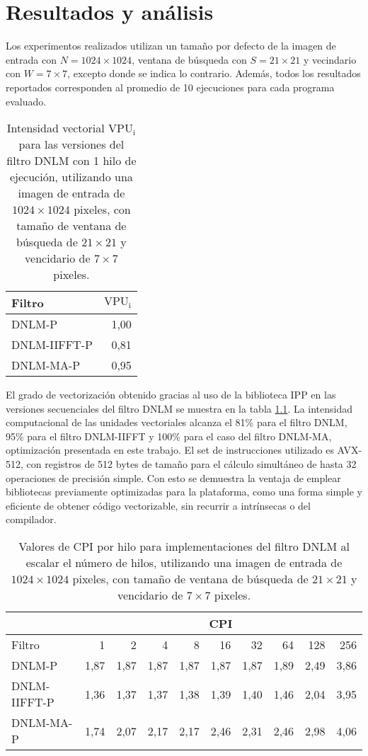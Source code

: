 \chapter{Resultados y análisis}
\label{ch:res}

Los experimentos realizados utilizan un tama\~no por defecto de la imagen de entrada con $N = 1024 \times 1024$, ventana de búsqueda con $S = 21 \times 21$ y vecindario con $W = 7 \times 7$, excepto donde se indica lo contrario. Adem\'as, todos los resultados reportados corresponden al promedio de 10 ejecuciones para cada programa evaluado.  

\begin{table}[htb]
\centering
\caption[Intensidad vectorial de operaciones con un hilo de ejecución]{Intensidad vectorial  $\text{VPU}_{\text{i}}$ para las versiones del filtro DNLM con 1 hilo de ejecución, utilizando una imagen de entrada de $1024 \times 1024$ pixeles, con tama\~no de ventana de búsqueda de $21 \times 21$ y vencidario de $7 \times 7$ pixeles. \label{tabla:vpui}}
\begin{tabular}{lr}
 Filtro & $\text{VPU}_{\text{i}}$ \tabularnewline
\hline
DNLM-P & 1,00 \tabularnewline
DNLM-IIFFT-P & 0,81 \tabularnewline
DNLM-MA-P & 0,95 \tabularnewline
\end{tabular}
\end{table}

El grado de vectorizaci\'on obtenido gracias al uso de la biblioteca IPP en las versiones secuenciales del filtro DNLM se muestra en la tabla \ref{tabla:vpui}. La intensidad computacional de las unidades vectoriales alcanza el 81\% para el filtro DNLM, 95\% para el filtro DNLM-IIFFT y 100\% para el caso del filtro DNLM-MA, optimizaci\'on presentada en este trabajo. El set de instrucciones utilizado es AVX-512, con registros de 512 bytes de tama\~no para el c\'alculo simult\'aneo de hasta 32 operaciones de precisi\'on simple. Con esto se demuestra la ventaja de emplear bibliotecas previamente optimizadas para la plataforma, como una forma simple y eficiente de obtener c\'odigo vectorizable, sin recurrir a intr\'insecas o  del compilador.


\begin{table}[bht]
\centering
\caption[Cambio en CPI al escalar el n\'umero de hilos]{Valores de CPI por hilo para implementaciones del filtro DNLM al escalar el n\'umero de hilos, utilizando una imagen de entrada de $1024 \times 1024$ pixeles, con tama\~no de ventana de búsqueda de $21 \times 21$ y vencidario de $7 \times 7$ pixeles. \label{tabla:cpi}}
\begin{tabular}{lrrrrrrrrr}
& \multicolumn{9}{c}{CPI} \tabularnewline
\hline
 Filtro & 1 & 2 & 4 & 8 & 16 & 32 & 64 & 128 & 256 \tabularnewline
\hline
DNLM-P & 1,87 & 1,87 & 1,87 & 1,87 & 1,87 & 1,87 & 1,89 & 2,49 & 3,86 \tabularnewline
DNLM-IIFFT-P & 1,36 & 1,37 & 1,37 & 1,38 & 1,39 & 1,40 & 1,46 & 2,04 & 3,95 \tabularnewline
DNLM-MA-P & 1,74 & 2,07 & 2,17 & 2,17 & 2,46 & 2,31 & 2,46 & 2,98 & 4,06 \tabularnewline
\end{tabular}
\end{table}


